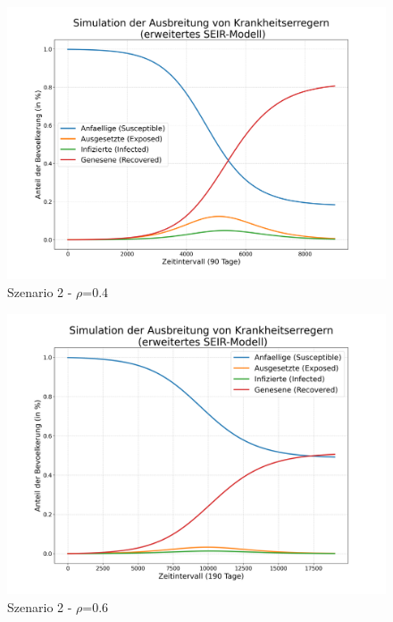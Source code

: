 \documentclass[12pt]{article}
\begin{document}
\begin{figure}[H]
\centering
\includegraphics[scale=0.4]{Szenario_2_rho_0.4}
\caption{Szenario 2 - $\rho$=0.4}
\label{fig:szenario_2_0.4}
\end{figure}

\begin{figure}[H]
\centering
\includegraphics[scale=0.4]{Szenario_2_rho_0.6}
\caption{Szenario 2 - $\rho$=0.6}
\label{fig:szenario_2_0.6}
\end{figure}
\end{document}
